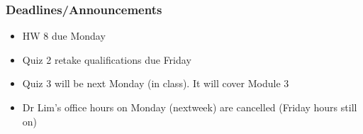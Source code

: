 
\begin{frame}
    \frametitle{Deadlines/Announcements}
\begin{itemize}
            \item HW 8 due Monday
            \item Quiz 2 retake qualifications due Friday 
            \item Quiz 3 will be next Monday (in class). It will cover Module 3
            \item Dr Lim's office hours on Monday (nextweek) are cancelled (Friday hours still on)
        \end{itemize}
\end{frame}


